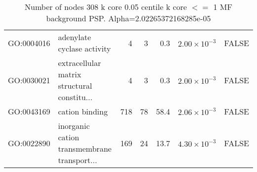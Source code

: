 \begin{table}[ht]
\begin{tabular}{llrrrrl}
  GO:0004016 & adenylate cyclase activity & 4 & 3 & 0.3 & $2.00 \times 10^{-3}$ & FALSE \\ 
  GO:0030021 & extracellular matrix structural constitu... & 4 & 3 & 0.3 & $2.00 \times 10^{-3}$ & FALSE \\ 
  GO:0043169 & cation binding & 718 & 78 & 58.4 & $2.06 \times 10^{-3}$ & FALSE \\ 
  GO:0022890 & inorganic cation transmembrane transport... & 169 & 24 & 13.7 & $4.30 \times 10^{-3}$ & FALSE \\ 
   \hline
\end{tabular}
\caption{Number of nodes 308 k core 0.05 centile  k core $<=$ 1 MF background PSP. Alpha=2.02265372168285e-05} 
\label{tab:Number of nodes 308 k core 0.05 centile  k core $<=$ 1 MF background PSP. Alpha=2.02265372168285e-05}
\end{table}


